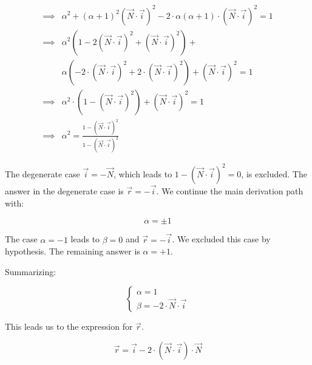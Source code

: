 \begin{equation} \begin{split}
\implies& \alpha^2 + (\alpha + 1)^2
(\overrightarrow{N} \cdot \overrightarrow{i})^2
- 2 \cdot \alpha (\alpha + 1) \cdot
(\overrightarrow{N} \cdot \overrightarrow{i})^2 = 1 \\
\implies& \alpha^2 (1 - 2 (\overrightarrow{N} \cdot \overrightarrow{i})^2
+ (\overrightarrow{N} \cdot \overrightarrow{i})^2) + \\
& \alpha (-2\cdot (\overrightarrow{N} \cdot \overrightarrow{i})^2
        +2 \cdot (\overrightarrow{N} \cdot \overrightarrow{i})^2) +
(\overrightarrow{N} \cdot \overrightarrow{i})^2 = 1 \\
\implies& \alpha^2 \cdot (1 - (\overrightarrow{N} \cdot \overrightarrow{i})^2)
+ (\overrightarrow{N} \cdot \overrightarrow{i})^2 = 1 \\
\implies& \alpha^2 = \frac{1 - (\overrightarrow{N} \cdot \overrightarrow{i})^2}
                          {1 - (\overrightarrow{N} \cdot \overrightarrow{i})^2}
\end{split} \end{equation}

The degenerate case $\overrightarrow{i} = - \overrightarrow{N}$, which
leads to $1 - (\overrightarrow{N} \cdot \overrightarrow{i})^2 = 0$, is excluded.
The answer in the degenerate case is $\overrightarrow{r} = -
\overrightarrow{i}$. We continue the main derivation path with:

\begin{equation}
\alpha = \pm 1
\end{equation}

The case $\alpha = -1$ leads to $\beta = 0$ and $\overrightarrow{r} = -
\overrightarrow{i}$. We excluded this case by hypothesis.  The remaining answer
is $\alpha = + 1$.

Summarizing:

\begin{equation} \begin{cases}
\alpha = 1 \\
\beta = -2 \cdot \overrightarrow{N} \cdot \overrightarrow{i}
\end{cases} \end{equation}

This leads us to the expression for $\overrightarrow{r}$.

\begin{equation}
\overrightarrow{r} = \overrightarrow{i} - 2 \cdot (\overrightarrow{N} \cdot
\overrightarrow{i}) \cdot \overrightarrow{N}
\end{equation}

